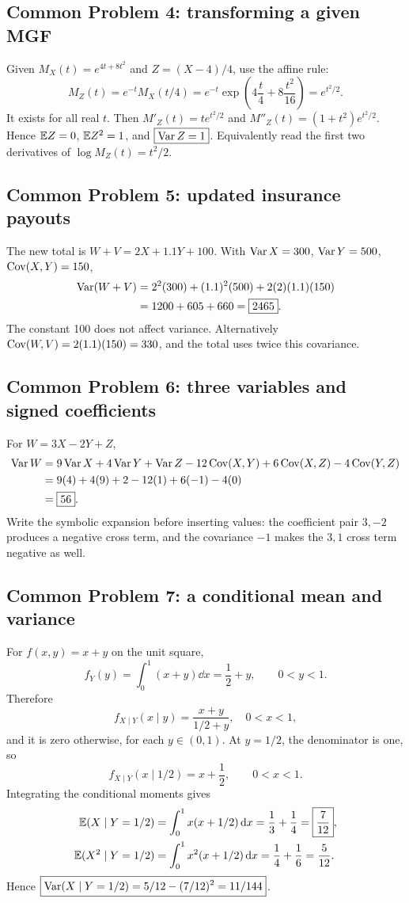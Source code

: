 \subsection{Common Problem 4: transforming a given MGF}
Given $M_X(t)=e^{4t+8t^2}$ and $Z=(X-4)/4$, use the affine rule:
\[
M_Z(t)=e^{-t}M_X(t/4)
=e^{-t}\exp\left(4\frac t4+8\frac{t^2}{16}\right)
=\boxed{e^{t^2/2}}.
\]
It exists for all real $t$. Then $M'_Z(t)=te^{t^2/2}$ and $M''_Z(t)=(1+t^2)e^{t^2/2}$. Hence $\mathbb E Z=0$, $\mathbb E Z^2=1$, and $\boxed{\operatorname{Var} Z=1}$. Equivalently read the first two derivatives of $\log M_Z(t)=t^2/2$.

\subsection{Common Problem 5: updated insurance payouts}
The new total is $W+V=2X+1.1Y+100$. With $\operatorname{Var} X=300$, $\operatorname{Var} Y=500$, $\operatorname{Cov}(X,Y)=150$,
\begin{align*}
\operatorname{Var}(W+V)&=2^2(300)+(1.1)^2(500)+2(2)(1.1)(150)\\
&=1200+605+660=\boxed{2465}.
\end{align*}
The constant 100 does not affect variance. Alternatively $\operatorname{Cov}(W,V)=2(1.1)(150)=330$, and the total uses twice this covariance.

\subsection{Common Problem 6: three variables and signed coefficients}
For $W=3X-2Y+Z$,
\begin{align*}
\operatorname{Var} W={}&9\operatorname{Var} X+4\operatorname{Var} Y+\operatorname{Var} Z
-12\operatorname{Cov}(X,Y)+6\operatorname{Cov}(X,Z)-4\operatorname{Cov}(Y,Z)\\
={}&9(4)+4(9)+2-12(1)+6(-1)-4(0)\\
={}&\boxed{56}.
\end{align*}
Write the symbolic expansion before inserting values: the coefficient pair $3,-2$ produces a negative cross term, and the covariance $-1$ makes the $3,1$ cross term negative as well.

\subsection{Common Problem 7: a conditional mean and variance}
For $f(x,y)=x+y$ on the unit square,
\[
f_Y(y)=\int_0^1(x+y)\dd x=\frac12+y,\qquad0<y<1.
\]
Therefore
\[
f_{X\mid Y}(x\mid y)=\frac{x+y}{1/2+y},\quad0<x<1,
\]
and it is zero otherwise, for each $y\in(0,1)$. At $y=1/2$, the denominator is one, so
\[
f_{X\mid Y}(x\mid1/2)=x+\frac12,\qquad0<x<1.
\]
Integrating the conditional moments gives
\begin{align*}
\mathbb E(X\mid Y=1/2)&=\int_0^1x(x+1/2)\,\mathrm d x=\frac13+\frac14=\boxed{\frac7{12}},\\
\mathbb E(X^2\mid Y=1/2)&=\int_0^1x^2(x+1/2)\,\mathrm d x=\frac14+\frac16=\frac5{12}.
\end{align*}
Hence $\boxed{\operatorname{Var}(X\mid Y=1/2)=5/12-(7/12)^2=11/144}$.

